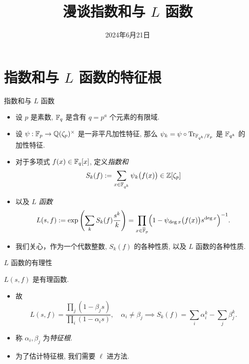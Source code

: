 \documentclass[aspectratio=169,handout]{ctexbeamer}
\title{漫谈指数和与 $L$ 函数}
\date{2024年6月21日}
\begin{document}
\frameoutline

\section{指数和与 $L$ 函数的特征根}

\begin{frame}{指数和与 $L$ 函数}
	\begin{itemize}
		\item 设 $p$ 是素数, ${\mathbb{F}}_q$ 是含有 $q=p^a$ 个元素的有限域.
		\item 设 $\psi:{\mathbb{F}}_p\to {\mathbb{Q}}(\zeta_p)^\times$ 是一非平凡加性特征, 那么 $\psi_k=\psi\circ {\mathrm{Tr}}_{{\mathbb{F}}_{q^k}/{\mathbb{F}}_p}$ 是 ${\mathbb{F}}_{q^k}$ 的加性特征.
		\item 对于多项式 $f(x)\in {\mathbb{F}}_q[x]$, 定义\emph{指数和}
		\[
			S_k(f):=\sum_{x\in{\mathbb{F}}_{q^k}}\psi_k\bigl(f(x)\bigr)\in{\mathbb{Z}}[\zeta_p]
		\]
		\item 以及 \emph{$L$ 函数}
		\[
			L(s,f):=\exp\left(\sum_k S_k(f)\frac{s^k}{k}\right)
			=\prod_{x\in\overline{{\mathbb{F}}}_p}\Bigl(1-\psi_{\deg x}\bigl(f(x)\bigr)s^{\deg x}\Bigr)^{-1}.
		\]
		\item 我们关心，作为一个代数整数, $S_k(f)$ 的各种性质, 以及 $L$ 函数的各种性质.
	\end{itemize}
\end{frame}


\begin{frame}{$L$ 函数的有理性}
	\onslide<+->
	\begin{theorem}
		$L(s,f)$ 是有理函数.
	\end{theorem}
	\begin{itemize}
		\item 故
		\[
			L(s,f)=\frac{\prod_j (1-\beta_j s)}{\prod_i(1-\alpha_i s)},\quad \alpha_i\neq \beta_j
			\implies
			S_k(f)=\sum_i \alpha_i^k-\sum_j\beta_j^k.
		\]
		\item 称 $\alpha_i,\beta_j$ 为\emph{特征根}.
		\item 为了估计特征根, 我们需要 $\ell$ 进方法.
	\end{itemize}

\end{frame}
\end{document}
